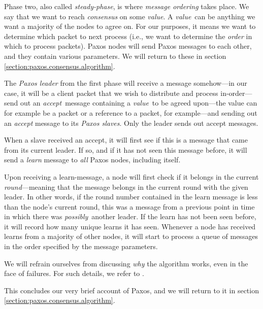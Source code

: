 Phase two, also called \textit{steady-phase}, is where \textit{message
ordering} takes place.   We say that we want to reach \textit{consensus} on
some \textit{value}.  A \textit{value} can be anything we want a majority of
the nodes to agree on.  For our purposes, it means we want to determine
which packet to next process (i.e., we want to determine the
    \textit{order} in which to process packets).  Paxos nodes will send
Paxos messages to each other, and they contain various parameters.  We will
return to these in section \vref{section:paxos.consensus.algorithm}.

The \textit{Paxos leader} from the first phase will receive a message
somehow---in our case, it will be a client packet that we wish to distribute
and process in-order---send out an \textit{accept} message containing a
\textit{value} to be agreed upon---the value can for example be a packet or
a reference to a packet, for example---and sending out an \textit{accept}
message to its \textit{Paxos slaves}.  Only the leader sends out accept
messages.

When a slave received an accept, it will first see if this is a message that
came from its current leader.  If so, and if it has not seen this message
before, it will send a \textit{learn} message to \textit{all} Paxos nodes,
including itself.

Upon receiving a learn-message, a node will first check if it belongs in the
current \textit{round}---meaning that the message belongs in the current
round with the given leader.  In other words, if the round number contained
in the learn message is less than the node's current round, this was a
message from a previous point in time in which there was
\textit{possibly} another leader.  If the learn has not been seen before, it
will record how many unique learns it has seen.
%
Whenever a node has received learns from a majority of other nodes, it will
start to process a queue of messages in the order specified by the message
parameters.

We will refrain ourselves from discussing \textit{why} the algorithm works,
even in the face of failures.  For such details, we refer to \cite{Lam01,Insane.Paxos}.

This concludes our very brief account of Paxos, and we will return to it in
section \ref{section:paxos.consensus.algorithm}.

